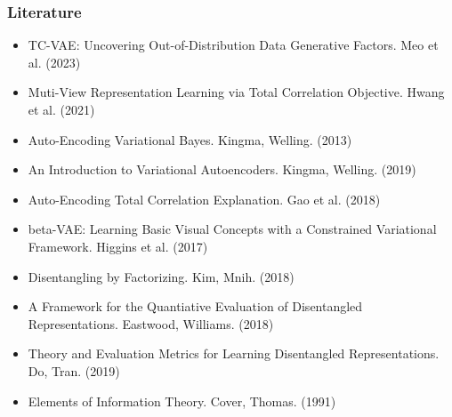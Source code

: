 \documentclass{beamer}
\theoremstyle{definition}
\begin{document}
    \begin{frame}[t, allowframebreaks]
      \frametitle{Literature}
      {\footnotesize
      \begin{itemize}
        \item  TC-VAE: Uncovering Out-of-Distribution Data Generative Factors. Meo et al. (2023)
        \item Muti-View Representation Learning via Total Correlation Objective. Hwang et al. (2021)
        \item Auto-Encoding Variational Bayes. Kingma, Welling. (2013)
        \item An Introduction to Variational Autoencoders. Kingma, Welling. (2019)
        \item Auto-Encoding Total Correlation Explanation. Gao et al. (2018)
        \item beta-VAE: Learning Basic Visual Concepts with a Constrained Variational Framework. Higgins et al. (2017)
        \item Disentangling by Factorizing. Kim, Mnih. (2018)
        \item A Framework for the Quantiative Evaluation of Disentangled Representations. Eastwood, Williams. (2018)
        \item Theory and Evaluation Metrics for Learning Disentangled Representations. Do, Tran. (2019)
        \item Elements of Information Theory. Cover, Thomas. (1991)
      \end{itemize}
      }

    \end{frame}


   
\end{document}
